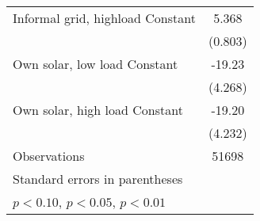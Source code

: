 \begin{table}[htbp]
{\begin{tabular}{l*{1}{c}}
Informal grid, highload Constant            &       5.368\sym{***}\\
                    &     (0.803)         \\
\midrule

Own solar, low load Constant            &      -19.23\sym{***}\\
                    &     (4.268)         \\
\midrule

Own solar, high load Constant            &      -19.20\sym{***}\\
                    &     (4.232)         \\
\midrule
Observations        &       51698         \\
\bottomrule
\multicolumn{2}{l}{\footnotesize Standard errors in parentheses}\\
\multicolumn{2}{l}{\footnotesize \sym{*} \(p<0.10\), \sym{**} \(p<0.05\), \sym{***} \(p<0.01\)}\\
\end{tabular}
}
\end{table}
